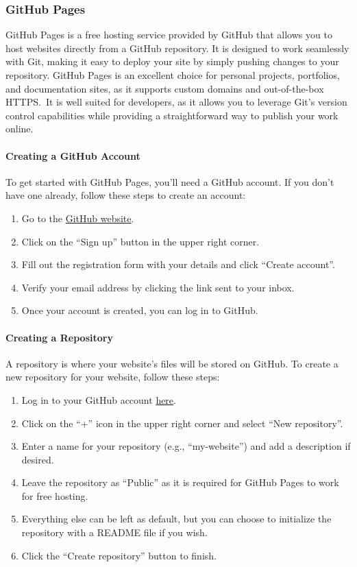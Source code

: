 \subsubsection{GitHub Pages}
GitHub Pages is a free hosting service provided by GitHub that allows you to host websites directly from a GitHub repository. It is designed to work seamlessly with Git, making it easy to deploy your site by simply pushing changes to your repository. GitHub Pages is an excellent choice for personal projects, portfolios, and documentation sites, as it supports custom domains and out-of-the-box HTTPS.\ It is well suited for developers, as it allows you to leverage Git's version control capabilities while providing a straightforward way to publish your work online.

\paragraph{Creating a GitHub Account}
To get started with GitHub Pages, you'll need a GitHub account. If you don't have one already, follow these steps to create an account:
\begin{enumerate}
    \item Go to the \href{https://github.com/}{GitHub website}.
    \item Click on the ``Sign up'' button in the upper right corner.
    \item Fill out the registration form with your details and click ``Create account''.
    \item Verify your email address by clicking the link sent to your inbox.
    \item Once your account is created, you can log in to GitHub.
\end{enumerate}

\paragraph{Creating a Repository}
A repository is where your website's files will be stored on GitHub. To create a new repository for your website, follow these steps:
\begin{enumerate}
    \item Log in to your GitHub account \href{https://github.com/login}{here}.
    \item Click on the ``+'' icon in the upper right corner and select ``New repository''.
    \item Enter a name for your repository (e.g., ``my-website'') and add a description if desired.
    \item Leave the repository as ``Public'' as it is required for GitHub Pages to work for free hosting.
    \item Everything else can be left as default, but you can choose to initialize the repository with a README file if you wish.
    \item Click the ``Create repository'' button to finish.
\end{enumerate}


